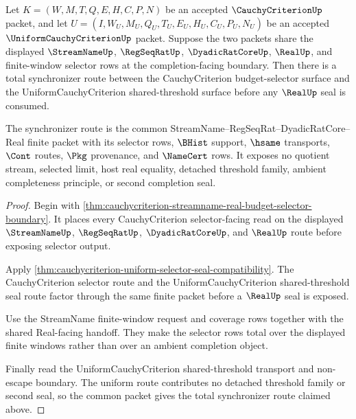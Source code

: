 \begin{theorem}
\label{thm:cauchycriterion-selector-seal-synchronizer-totality}
Let $K=(W,M,T,Q,E,H,C,P,N)$ be an accepted $\CauchyCriterionUp$ packet, and let $U=(I,W_U,M_U,Q_U,T_U,E_U,H_U,C_U,P_U,N_U)$ be an accepted $\UniformCauchyCriterionUp$ packet. Suppose the two packets share the displayed $\StreamNameUp$, $\RegSeqRatUp$, $\DyadicRatCoreUp$, $\RealUp$, and finite-window selector rows at the completion-facing boundary. Then there is a total synchronizer route between the CauchyCriterion budget-selector surface and the UniformCauchyCriterion shared-threshold surface before any $\RealUp$ seal is consumed.

The synchronizer route is the common StreamName--RegSeqRat--DyadicRatCore--Real finite packet with its selector rows, $\BHist$ support, $\hsame$ transports, $\Cont$ routes, $\Pkg$ provenance, and $\NameCert$ rows. It exposes no quotient stream, selected limit, host real equality, detached threshold family, ambient completeness principle, or second completion seal.
\end{theorem}
\begin{proof}
Begin with \autoref{thm:cauchycriterion-streamname-real-budget-selector-boundary}. It places every CauchyCriterion selector-facing read on the displayed $\StreamNameUp$, $\RegSeqRatUp$, $\DyadicRatCoreUp$, and $\RealUp$ route before exposing selector output.

Apply \autoref{thm:cauchycriterion-uniform-selector-seal-compatibility}. The CauchyCriterion selector route and the UniformCauchyCriterion shared-threshold seal route factor through the same finite packet before a $\RealUp$ seal is exposed.

Use the StreamName finite-window request and coverage rows together with the shared Real-facing handoff. They make the selector rows total over the displayed finite windows rather than over an ambient completion object.

Finally read the UniformCauchyCriterion shared-threshold transport and non-escape boundary. The uniform route contributes no detached threshold family or second seal, so the common packet gives the total synchronizer route claimed above.
\end{proof}

